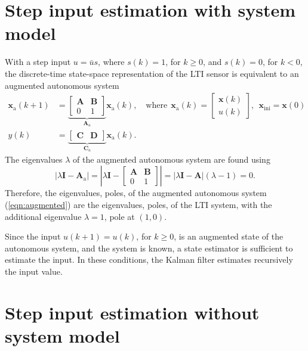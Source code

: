 \section{Step input estimation with system model}

With a step input ${u} = \bar{{u}} s$, where $s(k) = 1$, for $k \geq 0$, and $s(k) = 0$, for $k < 0$, the discrete-time state-space representation of the LTI sensor is equivalent to an augmented autonomous system  
\begin{equation} \begin{aligned} \mathbf{x}_\text{a}(k+1) &= \underbrace{ \begin{bmatrix} \mathbf{A} & \mathbf{B} \\ 0 & 1 \end{bmatrix} }_{\mathbf{A}_\text{a}} \mathbf{x}_\text{a}(k) , \quad \text{where} \ \ \mathbf{x}_\text{a}(k) = \begin{bmatrix} \mathbf{x}(k) \\ {u}(k) \end{bmatrix}, \ \ \mathbf{x}_{\text{ini}} = \mathbf{x}(0) \\
{y}(k) &= \underbrace{ \begin{bmatrix} \mathbf{C} & \mathbf{D} \end{bmatrix} }_{\mathbf{C}_\text{a}} \mathbf{x}_\text{a}(k) . \label{eqn:augmented} \end{aligned} \end{equation}
The eigenvalues $\lambda$ of the augmented autonomous system are found using
\[ \left| \lambda \mathbf{I} - \mathbf{A}_\text{a} \right| = \left| \lambda \mathbf{I} - \begin{bmatrix} \mathbf{A} & \mathbf{B} \\ 0 & 1 \end{bmatrix} \right| = \left| \lambda \mathbf{I} - \mathbf{A} \right| \left( \lambda - 1 \right) = 0.\]
Therefore, the eigenvalues, poles, of the augmented autonomous system (\ref{eqn:augmented}) are the eigenvalues, poles, of the LTI system, with the additional eigenvalue $\lambda = 1$, pole at $(1,0)$.  

Since the input ${u}(k+1) = {u}(k)$, for $k \geq 0$, is an augmented state of the autonomous system, and the system is known, a state estimator is sufficient to estimate the input.
In these conditions, the Kalman filter estimates recursively the input value.  

\section{Step input estimation without system model}

